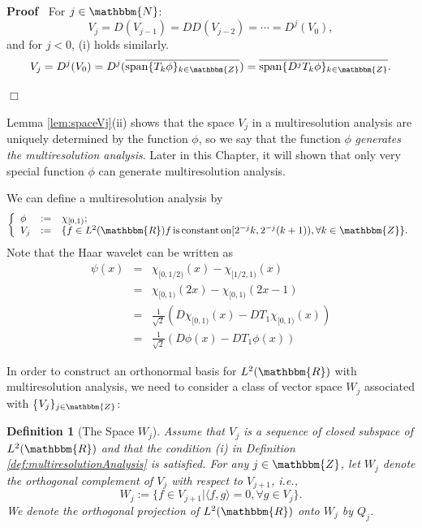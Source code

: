 \documentclass{book}
\newcommand{\assign}{:=}
\newcommand{\nobracket}{}
\newcommand{\tmop}[1]{\ensuremath{\operatorname{#1}}}
\newcommand{\tmtextit}[1]{{\itshape{#1}}}
\newenvironment{proof}{\noindent\textbf{Proof\ }}{\hspace*{\fill}$\Box$\medskip}
\newtheorem{definition}{Definition}
{\theorembodyfont{\rmfamily}\newtheorem{example}{Example}}
\begin{document}
\begin{proof}
  For $j \in \mathbbm{N}$:
  \[ V_j = D (V_{j - 1}) = D D (V_{j - 2}) = \cdots = D^j (V_0), \]
  and for $j < 0$, (i) holds similarly.
  \begin{equation}
    V_j = D^j (V_0) = D^j (\overline{\tmop{span} \{ T_k \phi \}_{k \in
    \mathbbm{Z}}}) = \overline{\tmop{span} \{ D^j T_k \phi \}_{k \in
    \mathbbm{Z}}} . \label{Vj}
  \end{equation}
  
\end{proof}

Lemma \ref{lem:spaceVj}(ii) shows that the space $V_j$ in a multiresolution
analysis are uniquely determined by the function $\phi$, so we say that the
function $\phi$ \tmtextit{generates the multiresolution analysis}. Later in
this Chapter, it will shown that only very special function $\phi$ can
generate multiresolution analysis.

\begin{example}
  \label{eg:haarMRA}We can define a multiresolution analysis by
  \[ \left\{ \begin{array}{lll}
       \phi & \assign & \chi_{[0, 1)} ;\\
       V_j & \assign & \{ f \in L^2 (\mathbbm{R}) f \tmop{is} \tmop{constant}
       \tmop{on} [2^{- j} k, 2^{- j} (k + 1)), \forall k \in \mathbbm{Z} \} .
     \end{array} \right. \]
  Note that the Haar wavelet can be written as
  \begin{eqnarray*}
    \psi (x) & = & \chi_{[0, 1 / 2)} (x) - \chi_{[1 / 2, 1)} (x)\\
    & = & \chi_{[0, 1)} (2 x) - \chi_{[0, 1)} (2 x - 1)\\
    & = & \frac{1}{\sqrt{2}} (D \chi_{[0, 1)} (x) - D T_1 \chi_{[0, 1)}
    (x))\\
    & = & \frac{1}{\sqrt{2}} (D \phi (x) - D T_1 \phi (x))
  \end{eqnarray*}
\end{example}

In order to construct an orthonormal basis for $L^2 (\mathbbm{R})$ with
multiresolution analysis, we need to consider a class of vector space $W_j$
associated with \{$V_j \}_{j \in \mathbbm{Z}} \nobracket$:

\begin{definition}[The Space $W_j$]
  Assume that $V_j$ is a sequence of closed subspace of $L^2 (\mathbbm{R})$
  and that the condition (i) in Definition \ref{def:multiresolutionAnalysis}
  is satisfied. For any $j \in \mathbbm{Z}$, let $W_j$ denote the orthogonal
  complement of $V_j$ with respect to $V_{j + 1}$, i.e.,
  \[ W_j \assign \{ f \in V_{j + 1} | \langle f, g \rangle = 0, \forall g \in
     V_j \} . \]
  We denote the orthogonal projection of $L^2 (\mathbbm{R})$ onto $W_j$ by
  $Q_j$.
\end{definition}
\end{document}
